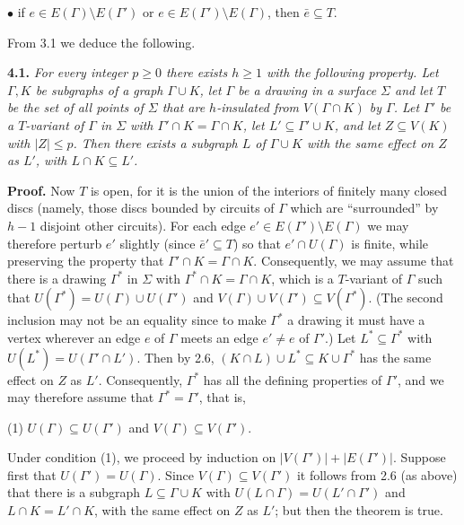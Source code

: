 \hspace*{12pt}$\bullet$ if $e \in E(\Gamma) \setminus E(\Gamma')$ or $e \in E(\Gamma') \setminus E(\Gamma)$, then $\bar{e} \subseteq T$.

From 3.1 we deduce the following.

\textbf{4.1.} \textit{For every integer $p \ge 0$ there exists $h \ge 1$ with the following property. Let $\Gamma, K$ be subgraphs of a graph $\Gamma \cup K$, let $\Gamma$ be a drawing in a surface $\Sigma$ and let $T$ be the set of all points of $\Sigma$ that are $h$-insulated from $V(\Gamma \cap K)$ by $\Gamma$. Let $\Gamma'$ be a $T$-variant of $\Gamma$ in $\Sigma$ with $\Gamma' \cap K = \Gamma \cap K$, let $L' \subseteq \Gamma' \cup K$, and let $Z \subseteq V(K)$ with $|Z| \le p$. Then there exists a subgraph $L$ of $\Gamma \cup K$ with the same effect on $Z$ as $L'$, with $L \cap K \subseteq L'$.}

\textbf{Proof.} Now $T$ is open, for it is the union of the interiors of finitely many closed discs (namely, those discs bounded by circuits of $\Gamma$ which are ``surrounded'' by $h - 1$ disjoint other circuits). For each edge $e' \in E(\Gamma') \setminus E(\Gamma)$ we may therefore perturb $e'$ slightly (since $\bar{e}' \subseteq T$) so that $e' \cap U(\Gamma)$ is finite, while preserving the property that $\Gamma' \cap K = \Gamma \cap K$. Consequently, we may assume that there is a drawing $\Gamma^*$ in $\Sigma$ with $\Gamma^* \cap K = \Gamma \cap K$, which is a $T$-variant of $\Gamma$ such that $U(\Gamma^*) = U(\Gamma) \cup U(\Gamma')$ and $V(\Gamma) \cup V(\Gamma') \subseteq V(\Gamma^*)$. (The second inclusion may not be an equality since to make $\Gamma^*$ a drawing it must have a vertex wherever an edge $e$ of $\Gamma$ meets an edge $e' \ne e$ of $\Gamma'$.) Let $L^* \subseteq \Gamma^*$ with $U(L^*) = U(\Gamma' \cap L')$. Then by 2.6, $(K \cap L) \cup L^* \subseteq K \cup \Gamma^*$ has the same effect on $Z$ as $L'$. Consequently, $\Gamma^*$ has all the defining properties of $\Gamma'$, and we may therefore assume that $\Gamma^* = \Gamma'$, that is,

\hspace*{12pt}(1) $U(\Gamma) \subseteq U(\Gamma')$ and $V(\Gamma) \subseteq V(\Gamma')$.

Under condition (1), we proceed by induction on $|V(\Gamma')| + |E(\Gamma')|$. Suppose first that $U(\Gamma') = U(\Gamma)$. Since $V(\Gamma) \subseteq V(\Gamma')$ it follows from 2.6 (as above) that there is a subgraph $L \subseteq \Gamma \cup K$ with $U(L \cap \Gamma) = U(L' \cap \Gamma')$ and $L \cap K = L' \cap K$, with the same effect on $Z$ as $L'$; but then the theorem is true.

